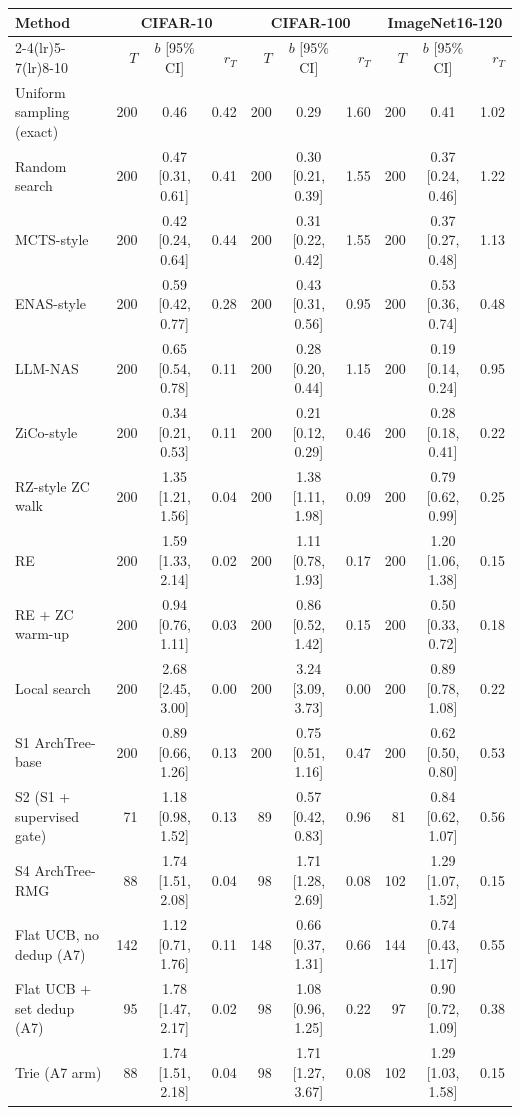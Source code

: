 \begin{tabular}{@{}lrcrrcrrcr@{}}
\toprule
\multirow{2}{*}{Method} & \multicolumn{3}{c}{CIFAR-10} & \multicolumn{3}{c}{CIFAR-100} & \multicolumn{3}{c}{ImageNet16-120}\\
\cmidrule(lr){2-4}\cmidrule(lr){5-7}\cmidrule(lr){8-10}
 & $T$ & $b$ [95\% CI] & $r_T$ & $T$ & $b$ [95\% CI] & $r_T$ & $T$ & $b$ [95\% CI] & $r_T$\\
\midrule
Uniform sampling (exact) & 200 & 0.46 & 0.42 & 200 & 0.29 & 1.60 & 200 & 0.41 & 1.02\\
Random search & 200 & 0.47 [0.31, 0.61] & 0.41 & 200 & 0.30 [0.21, 0.39] & 1.55 & 200 & 0.37 [0.24, 0.46] & 1.22\\
MCTS-style & 200 & 0.42 [0.24, 0.64] & 0.44 & 200 & 0.31 [0.22, 0.42] & 1.55 & 200 & 0.37 [0.27, 0.48] & 1.13\\
ENAS-style & 200 & 0.59 [0.42, 0.77] & 0.28 & 200 & 0.43 [0.31, 0.56] & 0.95 & 200 & 0.53 [0.36, 0.74] & 0.48\\
LLM-NAS & 200 & 0.65 [0.54, 0.78] & 0.11 & 200 & 0.28 [0.20, 0.44] & 1.15 & 200 & 0.19 [0.14, 0.24] & 0.95\\
ZiCo-style & 200 & 0.34 [0.21, 0.53] & 0.11 & 200 & 0.21 [0.12, 0.29] & 0.46 & 200 & 0.28 [0.18, 0.41] & 0.22\\
RZ-style ZC walk & 200 & 1.35 [1.21, 1.56] & 0.04 & 200 & 1.38 [1.11, 1.98] & 0.09 & 200 & 0.79 [0.62, 0.99] & 0.25\\
RE & 200 & 1.59 [1.33, 2.14] & 0.02 & 200 & 1.11 [0.78, 1.93] & 0.17 & 200 & 1.20 [1.06, 1.38] & 0.15\\
RE + ZC warm-up & 200 & 0.94 [0.76, 1.11] & 0.03 & 200 & 0.86 [0.52, 1.42] & 0.15 & 200 & 0.50 [0.33, 0.72] & 0.18\\
Local search & 200 & 2.68 [2.45, 3.00] & 0.00 & 200 & 3.24 [3.09, 3.73] & 0.00 & 200 & 0.89 [0.78, 1.08] & 0.22\\
S1 ArchTree-base & 200 & 0.89 [0.66, 1.26] & 0.13 & 200 & 0.75 [0.51, 1.16] & 0.47 & 200 & 0.62 [0.50, 0.80] & 0.53\\
S2 (S1 + supervised gate) & 71 & 1.18 [0.98, 1.52] & 0.13 & 89 & 0.57 [0.42, 0.83] & 0.96 & 81 & 0.84 [0.62, 1.07] & 0.56\\
S4 ArchTree-RMG & 88 & 1.74 [1.51, 2.08] & 0.04 & 98 & 1.71 [1.28, 2.69] & 0.08 & 102 & 1.29 [1.07, 1.52] & 0.15\\
Flat UCB, no dedup (A7) & 142 & 1.12 [0.71, 1.76] & 0.11 & 148 & 0.66 [0.37, 1.31] & 0.66 & 144 & 0.74 [0.43, 1.17] & 0.55\\
Flat UCB + set dedup (A7) & 95 & 1.78 [1.47, 2.17] & 0.02 & 98 & 1.08 [0.96, 1.25] & 0.22 & 97 & 0.90 [0.72, 1.09] & 0.38\\
Trie (A7 arm) & 88 & 1.74 [1.51, 2.18] & 0.04 & 98 & 1.71 [1.27, 3.67] & 0.08 & 102 & 1.29 [1.03, 1.58] & 0.15\\
\bottomrule
\end{tabular}
